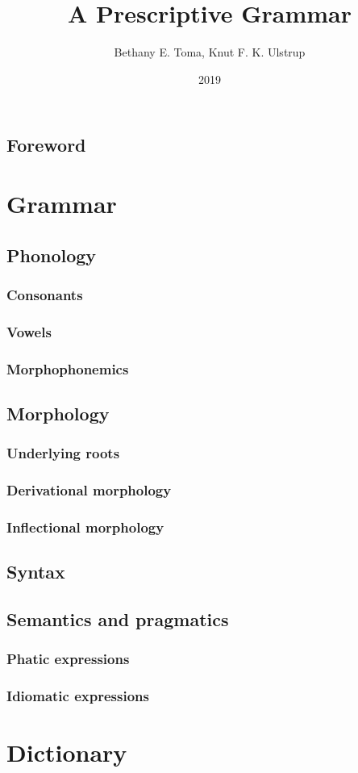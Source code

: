 \documentclass[10pt]{extbook}
\title{{\fontsize{80}{80}\selectfont \lang} \\ \Huge \sffamily A Prescriptive Grammar}
\author{Bethany E. Toma, Knut F. K. Ulstrup}
\date{2019}
\begin{document}
\pagecolor{Melon}
\maketitle
\pagecolor{white}

\frontmatter

\chapter{Foreword}

\tableofcontents

\mainmatter

\part{Grammar}

\chapter{Phonology}
\section{Consonants}
\section{Vowels}
\section{Morphophonemics}

\chapter{Morphology}
\section{Underlying roots}
\section{Derivational morphology}
\section{Inflectional morphology}

\chapter{Syntax}

\chapter{Semantics and pragmatics}
\section{Phatic expressions}
\section{Idiomatic expressions}

\part{Dictionary}
\end{document}
